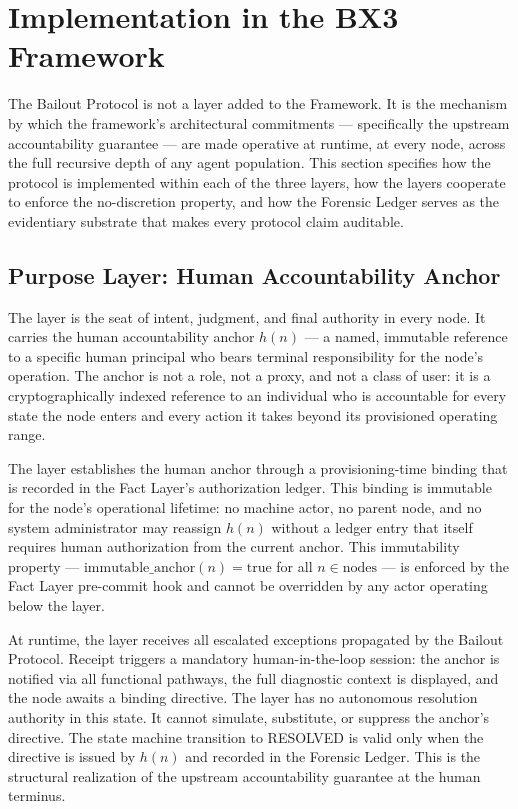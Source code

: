 \section{Implementation in the BX3 Framework}
\label{sec:implementation}

The Bailout Protocol is not a layer added to the \bxthree{} Framework. It is the mechanism by which the framework's architectural commitments — specifically the upstream accountability guarantee — are made operative at runtime, at every node, across the full recursive depth of any agent population. This section specifies how the protocol is implemented within each of the three layers, how the layers cooperate to enforce the no-discretion property, and how the Forensic Ledger serves as the evidentiary substrate that makes every protocol claim auditable.

\subsection{Purpose Layer: Human Accountability Anchor}
\label{sec:impl:purpose}

The \purpose{} layer is the seat of intent, judgment, and final authority in every \bxthree{} node. It carries the human accountability anchor $h(n)$ — a named, immutable reference to a specific human principal who bears terminal responsibility for the node's operation. The anchor is not a role, not a proxy, and not a class of user: it is a cryptographically indexed reference to an individual who is accountable for every state the node enters and every action it takes beyond its provisioned operating range.

The \purpose{} layer establishes the human anchor through a provisioning-time binding that is recorded in the Fact Layer's authorization ledger. This binding is immutable for the node's operational lifetime: no machine actor, no parent node, and no system administrator may reassign $h(n)$ without a ledger entry that itself requires human authorization from the current anchor. This immutability property — $\text{immutable\_anchor}(n) = \text{true}$ for all $n \in \text{nodes}$ — is enforced by the Fact Layer pre-commit hook and cannot be overridden by any actor operating below the \purpose{} layer.

At runtime, the \purpose{} layer receives all escalated exceptions propagated by the Bailout Protocol. Receipt triggers a mandatory human-in-the-loop session: the anchor is notified via all functional pathways, the full diagnostic context is displayed, and the node awaits a binding directive. The \purpose{} layer has no autonomous resolution authority in this state. It cannot simulate, substitute, or suppress the anchor's directive. The state machine transition to RESOLVED is valid only when the directive is issued by $h(n)$ and recorded in the Forensic Ledger. This is the structural realization of the upstream accountability guarantee at the human terminus.

